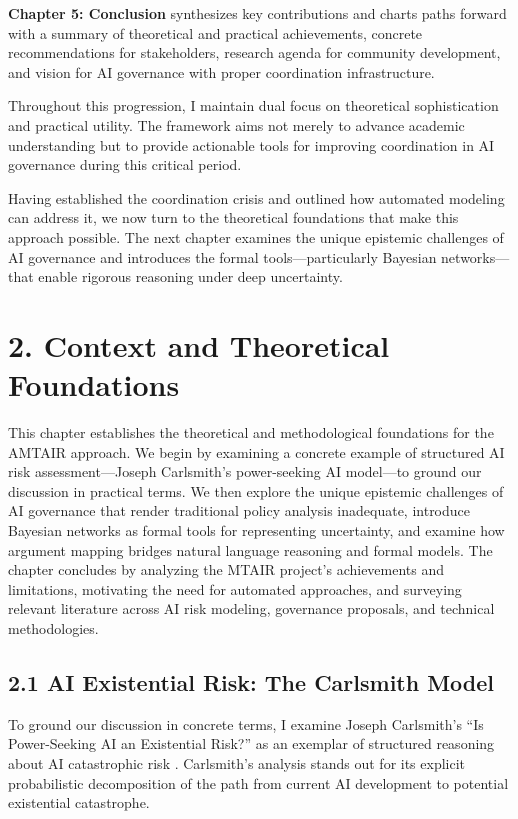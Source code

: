 \documentclass[
  11pt,
  letterpaper,
]{book}
\begin{document}
\textbf{Chapter 5: Conclusion} synthesizes key contributions and charts
paths forward with a summary of theoretical and practical achievements,
concrete recommendations for stakeholders, research agenda for community
development, and vision for AI governance with proper coordination
infrastructure.

Throughout this progression, I maintain dual focus on theoretical
sophistication and practical utility. The framework aims not merely to
advance academic understanding but to provide actionable tools for
improving coordination in AI governance during this critical period.

Having established the coordination crisis and outlined how automated
modeling can address it, we now turn to the theoretical foundations that
make this approach possible. The next chapter examines the unique
epistemic challenges of AI governance and introduces the formal
tools---particularly Bayesian networks---that enable rigorous reasoning
under deep uncertainty.


\chapter{2. Context and Theoretical
Foundations}\label{context-and-theoretical-foundations}

This chapter establishes the theoretical and methodological foundations
for the AMTAIR approach. We begin by examining a concrete example of
structured AI risk assessment---Joseph Carlsmith's power-seeking AI
model---to ground our discussion in practical terms. We then explore the
unique epistemic challenges of AI governance that render traditional
policy analysis inadequate, introduce Bayesian networks as formal tools
for representing uncertainty, and examine how argument mapping bridges
natural language reasoning and formal models. The chapter concludes by
analyzing the MTAIR project's achievements and limitations, motivating
the need for automated approaches, and surveying relevant literature
across AI risk modeling, governance proposals, and technical
methodologies.

\section{2.1 AI Existential Risk: The Carlsmith
Model}\label{ai-existential-risk-the-carlsmith-model}

To ground our discussion in concrete terms, I examine Joseph Carlsmith's
``Is Power-Seeking AI an Existential Risk?'' as an exemplar of
structured reasoning about AI catastrophic risk
\textcite{carlsmith2022}. Carlsmith's analysis stands out for its
explicit probabilistic decomposition of the path from current AI
development to potential existential catastrophe.
\end{document}
